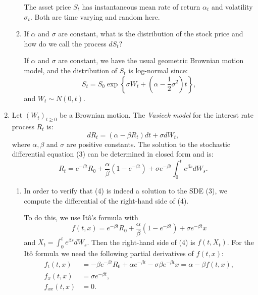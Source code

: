 \documentclass[handout,8pt]{beamer}
\begin{document}
\begin{frame}[allowframebreaks]{ }
\begin{enumerate}
\begin{enumerate}
        The asset price $S_t$ has instantaneous mean rate of return $\alpha_t$ and volatility $\sigma_t$. Both are time varying and random here.
        
        \newpage
        
	\vspace*{2.0cm}
	
        \item If $\alpha$ and $\sigma$ are constant, what is the distribution of the stock price and how do we call the process $dS_t$? \newline 
        
        If $\alpha$ and $\sigma$ are constant, we have the usual geometric Brownian motion model, and the distribution of $S_t$ is log-normal since:
        \begin{equation*}
            S_t = S_0 \exp\left\{\sigma W_t + \left( \alpha -\frac{1}{2}\sigma^2 \right) t \right\},
        \end{equation*}
        and $W_t \sim N(0,t)$.
    \end{enumerate}

    \newpage
    
    \item Let $(W_t)_{t\geq 0}$ be a Brownian motion. The \textit{Vasicek model} for the interest rate process $R_t$ is:
    \begin{equation}
        dR_t=(\alpha-\beta R_t) dt + \sigma dW_t,
    \end{equation}
    where $\alpha, \beta$ and $\sigma$ are positive constants. The solution to the stochastic differential equation (3) can be determined in closed form and is:
    \begin{equation}
        R_t=e^{-\beta t} R_0 +\frac{\alpha}{\beta}(1-e^{-\beta t}) + \sigma e^{-\beta t} \int_0^t e^{\beta s} dW_s.
    \end{equation}
    
    \begin{enumerate}
        \item In order to verify that (4) is indeed a solution to the SDE (3), we compute the differential of the right-hand side of (4). \newline 
        
        To do this, we use Itô's formula with
        \begin{equation*}
            f(t,x) = e^{-\beta t}R_0 + \frac{\alpha}{\beta}(1-e^{-\beta t}) + \sigma e^{-\beta t}x
        \end{equation*}
        and $X_t=\int_0^t e^{\beta s} dW_s$. Then the right-hand side of (4) is $f(t,X_t)$. For the Itô formula we need the following partial derivatives of $f(t,x)$:
        \begin{align*}
            f_t(t,x) &= -\beta e^{-\beta t}R_0 + \alpha e^{-\beta t} - \sigma\beta e^{-\beta t}x=\alpha -\beta f(t,x),\\
            f_x(t,x) &= \sigma e^{-\beta t},\\
            f_{xx}(t,x) &= 0.
        \end{align*}
        

\end{enumerate}
\end{enumerate}
\end{frame}
\end{document}
